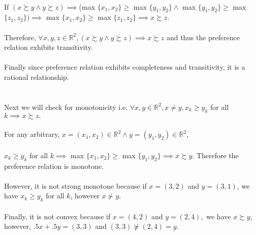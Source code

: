 \documentclass[12pt]{article}
\newenvironment{problem}[2][Problem]{\begin{trivlist}
\item[\hskip \labelsep {\bfseries #1}\hskip \labelsep {\bfseries #2.}]}{\end{trivlist}}
\begin{document}
\begin{problem}{1}
\\
If $ (x \succsim y \land y \succsim z) \implies $(max $\{x_1,x_2 \} \geq $ max $\{y_1,y_2 \} \land $ max $\{y_1,y_2 \} \geq $ max $\{z_1,z_2 \}) \implies $ max $\{x_1,x_2 \} \geq $ max $\{z_1,z_2 \} \implies  x \succsim z.$
\\
\\
Therefore, $\forall x, y, z \in \mathbb{R}^{2}, (x \succsim y \land y \succsim z) \implies x \succsim z$ and thus the preference relation exhibits transitivity.
\\
\\
Finally since preference relation exhibits completeness and transitivity, it is a rational relationship. 
\\
\\
\\
Next we will check for monotonicity i.e. $\forall x, y \in \mathbb{R}^{2}, x \neq y, x_k \geq y_k $ for all $ k \implies x \succsim z.$
\\
\\
For any arbitrary, $x = (x_1, x_2) \in \mathbb{R}^{2} \land  y= (y_1, y_2) \in \mathbb{R}^{2}$,
\\
\\
$x_k \geq y_k $ for all $ k \implies $ max $ \{x_1, x_2\} \geq  $ max $ \{y_1, y_2\} \implies x \succsim y$. Therefore the preference relation is monotone. 
\\
\\
However, it is not strong monotone because if $ x = (3,2) $ and $ y = (3,1) $, we have $x_k \geq y_k $ for all $ k $, however $x \nsucc y.$  
\\
\\
Finally, it is not convex because if $ x = (4,2) $ and $ y = (2,4),$ we have $x \succsim y $, however, $ .5 x + .5 y = (3,3)$ and $(3,3) \nsucceq (2,4) = y. $   
\\
\\
\end{problem}
\end{document}
